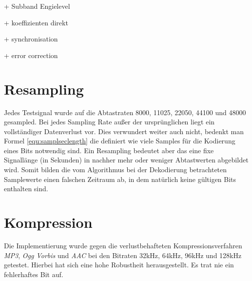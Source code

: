 + Subband Engielevel

+ koeffizienten direkt

+ synchronisation

+ error correction

\section{Resampling}

Jedes Testsignal wurde auf die Abtastraten 8000, 11025, 22050, 44100 und 48000 gesampled. Bei jedes Sampling Rate außer der ursprünglichen liegt ein vollständiger Datenverlust vor. Dies verwundert weiter auch nicht, bedenkt man Formel \ref{equ:samplseclength} die definiert wie viele Samples für die Kodierung eines Bits notwendig sind. Ein Resampling bedeutet aber das eine fixe Signallänge (in Sekunden) in nachher mehr oder weniger Abtastwerten abgebildet wird. Somit bilden die vom Algorithmus bei der Dekodierung betrachteten Samplewerte einen falschen Zeitraum ab, in dem natürlich keine gültigen Bits enthalten sind. 

\section{Kompression}

Die Implementierung wurde gegen die verlustbehafteten Kompressionsverfahren \textit{MP3}, \textit{Ogg Vorbis} und \textit{AAC} bei den Bitraten 32kHz, 64kHz, 96kHz und 128kHz getestet. Hierbei hat sich eine hohe Robustheit herausgestellt. Es trat nie ein fehlerhaftes Bit auf.  







